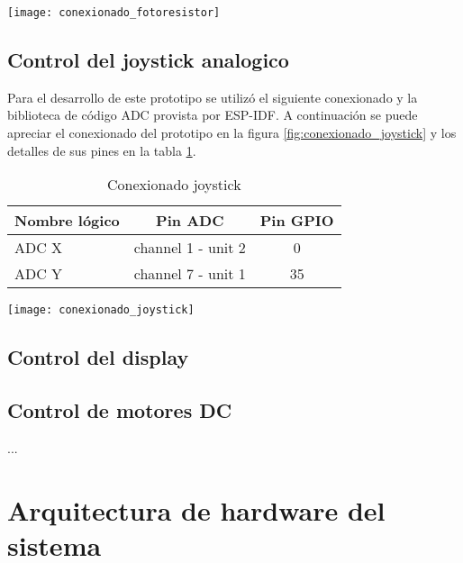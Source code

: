 \vspace{0.5cm}
\begin{center}
  \texttt{[image: conexionado\_fotoresistor]}
    \label{fig:conexionado_fotoresistor}
    
\end{center}
\subsection{Control del joystick analogico}
Para el desarrollo de este prototipo se utilizó el siguiente conexionado y la biblioteca de código ADC provista por ESP-IDF. A continuación se puede apreciar el conexionado del prototipo en la figura \ref{fig:conexionado_joystick} y los detalles de sus pines en la tabla \ref{tab:conexionado_joystick}.


\vspace{0.5cm}
\begin{table}[h]
\centering
\caption[Conexionado joystick]{Conexionado joystick}
\begin{tabular}{l c c}
\toprule
\textbf{Nombre lógico} & \textbf{Pin ADC} & \textbf{Pin GPIO}\\
\midrule
ADC X & channel 1 - unit 2 & 0 \\
ADC Y & channel 7 - unit 1 & 35 \\
\bottomrule
\hline
\end{tabular}
\label{tab:conexionado_joystick}
\end{table}

\vspace{0.5cm}

\begin{center}
  \texttt{[image: conexionado\_joystick]}
    \label{fig:conexionado_joystick}
    

\end{center}

\subsection{Control del display}
 

\subsection{Control de motores DC}


...




\section{Arquitectura de hardware del sistema}

